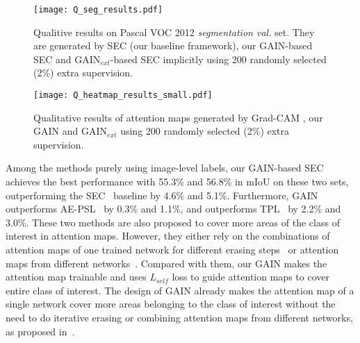 \documentclass[10pt,twocolumn,letterpaper]{article}
\begin{document}
\begin{figure}%
\centering
\texttt{[image: Q\_seg\_results.pdf]} %
\caption{Qualitive results on Pascal VOC 2012 \emph{segmentation val.} set. They are generated by SEC (our baseline framework), our GAIN-based SEC and GAIN$_{ext}$-based SEC implicitly using 200 randomly selected (2\%) extra supervision.}
\label{fig:Q_seg}
\end{figure}



\begin{figure*}%
\centering
\texttt{[image: Q\_heatmap\_results\_small.pdf]} %
\caption{Qualitative results of attention maps generated by Grad-CAM \cite{grad-cam}, our GAIN and GAIN$_{ext}$ using 200 randomly selected (2\%) extra supervision.}
\label{fig:Q_heatmaps}
\end{figure*}
Among the methods purely using image-level labels, our GAIN-based SEC achieves the best performance with 55.3\% and 56.8\% in mIoU on these two sets, outperforming the SEC~\cite{kolesnikov2016seed} baseline by 4.6\% and 5.1\%. Furthermore, GAIN outperforms AE-PSL~\cite{wei2017object} by 0.3\% and 1.1\%, and outperforms TPL~\cite{kim2017two} by 2.2\% and 3.0\%. These two methods are also proposed to cover more areas of the class of interest in attention maps. However, they either rely on the combinations of attention maps of one trained network for different erasing steps~\cite{wei2017object} or attention maps from different networks~\cite{kim2017two}. Compared with them, our GAIN makes the attention map trainable and uses $L_{self}$ loss to guide attention maps to cover entire class of interest. The design of GAIN already makes the attention map of a single network cover more areas belonging to the class of interest without the need to do iterative erasing or combining attention maps from different networks, as proposed in~\cite{kim2017two,wei2017object}.



\end{document}
